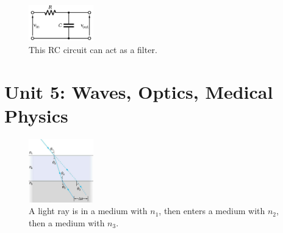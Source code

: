\documentclass[12pt,twocolumn]{article}
\begin{document}
\begin{figure}
\centering
\includegraphics[width=0.25\textwidth]{low-pass.png}
\caption{\label{fig:RC} \small This RC circuit can act as a filter.}
\end{figure}

\section{Unit 5: Waves, Optics, Medical Physics}

\begin{figure}
\centering
\includegraphics[width=0.25\textwidth]{lens_1.jpeg}
\caption{\label{fig:lens_1} \small A light ray is in a medium with $n_1$, then enters a medium with $n_2$, then a medium with $n_3$.}
\end{figure}
\end{document}

